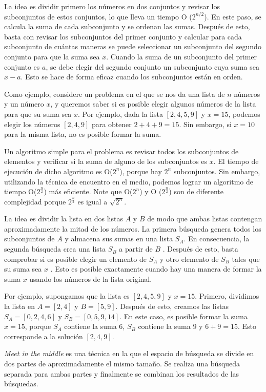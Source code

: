 La idea es dividir primero los números en dos conjuntos y revisar los subconjuntos de estos conjuntos, lo que lleva un tiempo O ($2^{n/2}$). En este paso, se calcula la suma de cada subconjunto y se ordenan las sumas. Después de esto, basta con revisar los subconjuntos del primer conjunto y calcular para cada subconjunto de cuántas maneras se puede seleccionar un subconjunto del segundo conjunto para que la suma sea $x$. Cuando la suma de un subconjunto del primer conjunto es $a$, se debe elegir del segundo conjunto un subconjunto cuya suma sea $x-a$. Esto se hace de forma eficaz cuando los subconjuntos están en orden.

Como ejemplo, considere un problema en el que se nos da una lista de $n$ números y un número $x$, y queremos saber si es posible elegir algunos números de la lista para que su suma sea $x$. Por ejemplo, dada la lista $[2, 4, 5, 9]$ y $x = 15$, podemos elegir los números $[2, 4, 9]$ para obtener $2 + 4 + 9 = 15$. Sin embargo, si $x = 10$ para la misma lista, no es posible formar la suma.

Un algoritmo simple para el problema es revisar todos los subconjuntos de elementos y verificar si la suma de alguno de los subconjuntos es $x$. El tiempo de ejecución de dicho algoritmo es O($2^n$), porque hay $2^n$ subconjuntos. Sin embargo, utilizando la técnica de encuentro en el medio, podemos lograr un algoritmo de tiempo O($2^{\frac{n}{2}}$) más eficiente. Note que O($2^n$) y O ($2^{\frac{n}{2}}$) son de diferente complejidad porque $2^{\frac{n}{2}}$ es igual a $\sqrt{2^n}$.

La idea es dividir la lista en dos listas $A$ y $B$ de modo que ambas listas contengan aproximadamente la mitad de los números. La primera búsqueda genera todos los subconjuntos de $A$ y almacena sus sumas en una lista $S_A$. En consecuencia, la segunda búsqueda crea una lista $S_B$ a partir de $B$ . Después de esto, basta comprobar si es posible elegir un elemento de $S_A$ y otro elemento de $S_B$ tales que su suma sea $x$ . Esto es posible exactamente cuando hay una manera de formar la suma $x$ usando los números de la lista original.

Por ejemplo, supongamos que la lista es $[2, 4, 5, 9]$ y $x = 15$. Primero, dividimos la lista en $A = [2, 4]$ y $B = [5, 9]$. Después de esto, creamos las listas $S_A = [0, 2, 4, 6]$ y $S_B = [0, 5, 9, 14]$. En este caso, es posible formar la suma $x = 15$, porque $S_A$ contiene la suma $6$, $S_B$ contiene la suma $9$ y $6 + 9 = 15$. Esto corresponde a la solución $[2, 4, 9]$.

\emph{Meet in the middle} es una técnica en la que el espacio de búsqueda se divide en dos partes de aproximadamente el mismo tamaño. Se realiza una búsqueda separada para ambas partes y finalmente se combinan los resultados de las búsquedas.